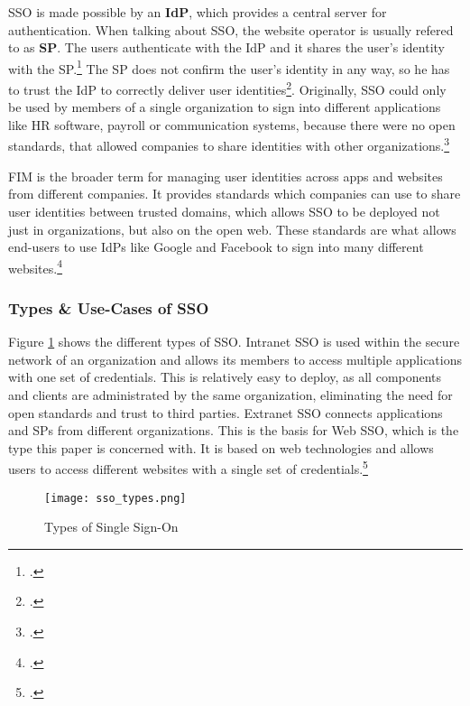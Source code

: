 \ac{SSO} is made possible by an \textbf{\ac{IdP}}, which provides a central server for authentication.
When talking about \ac{SSO}, the website operator is usually refered to as \textbf{\ac{SP}}.
The users authenticate with the \ac{IdP} and it shares the user's identity with the \ac{SP}.\footcite[Cp.][p. 24]{Beltran2016}
The \ac{SP} does not confirm the user's identity in any way, so he has to trust the \ac{IdP} to correctly
deliver user identities\footcite[Cp.][]{Nallathamby2018}.
Originally, \ac{SSO} could only be used by members of a single organization to sign into different 
applications like HR software, payroll or communication systems, because there were no open standards,
that allowed companies to share identities with other organizations.\footcite[Cp.][]{OktaFIM}

\ac{FIM} is the broader term for managing user identities across apps and websites from different companies.
It provides standards which companies can use to share user identities between trusted domains,
which allows \ac{SSO} to be deployed not just in organizations, but also on the open web.
These standards are what allows end-users to use \acp{IdP} like Google and Facebook to sign into many
different websites.\footcite[Cp.][]{OktaFIM}

\subsubsection{Types \& Use-Cases of SSO}

Figure \ref{fig:sso_types} shows the different types of \ac{SSO}.
Intranet \ac{SSO} is used within the secure network of an organization and allows its members to 
access multiple applications with one set of credentials. This is relatively easy to deploy, as all components
and clients are administrated by the same organization, eliminating the need for open standards and trust to
third parties.
Extranet \ac{SSO} connects applications and \acp{SP} from different organizations.
This is the basis for Web \ac{SSO}, which is the type this paper is concerned with.
It is based on web technologies and allows users to access different websites with a single set of credentials.\footcite[Cp.][p. 135]{Radha2012}

\begin{figure}[H]
    \centering
    \caption{Types of Single Sign-On}
	\label{fig:sso_types}
    \texttt{[image: sso\_types.png]}
    \\
    \cite[Source:][]{Radha2012}
\end{figure}

